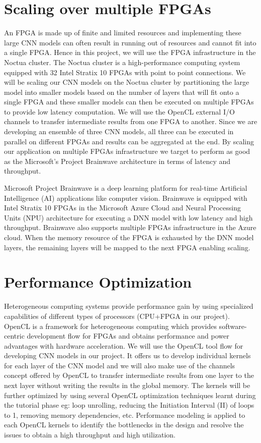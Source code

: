 \documentclass[titlepage]{report}
\begin{document}
\section{Scaling over multiple FPGAs}
An FPGA is made up of finite and limited resources and implementing these large CNN models can often result in running out of resources and cannot fit into a single FPGA. Hence in this project, we will use the FPGA infrastructure in the Noctua cluster. The Noctua cluster is a high-performance computing system equipped with 32 Intel Stratix 10 FPGAs with point to point connections. We will be scaling our CNN models on the Noctua cluster by partitioning the large model into smaller models based on the number of layers that will fit onto a single FPGA and these smaller models can then be executed on multiple FPGAs to provide low latency computation. We will use the OpenCL external I/O channels to transfer intermediate results from one FPGA to another. Since we are developing an ensemble of three CNN models, all three can be executed in parallel on different FPGAs and results can be aggregated at the end. By scaling our application on multiple FPGAs infrastructure we target to perform as good as the Microsoft's Project Brainwave architecture in terms of latency and throughput.
\par
Microsoft Project Brainwave is a deep learning platform for real-time Artificial Intelligence (AI) applications like computer vision. Brainwave is equipped with Intel Stratix 10 FPGAs in the Microsoft Azure Cloud and Neural Processing Units (NPU) architecture for executing a DNN model with low latency and high throughput. Brainwave also supports multiple FPGAs infrastructure in the Azure cloud. When the memory resource of the FPGA is exhausted by the DNN model layers, the remaining layers will be mapped to the next FPGA enabling scaling.

\section{Performance Optimization}
Heterogeneous computing systems provide performance gain by using specialized capabilities of different types of processors (CPU+FPGA in our project). OpenCL is a framework for heterogeneous computing which provides software-centric development flow for FPGAs and obtains performance and power advantages with hardware acceleration. We will use the OpenCL tool flow for developing CNN models in our project. It offers us to develop individual kernels for each layer of the CNN model and we will also make use of the channels concept offered by OpenCL to transfer intermediate results from one layer to the next layer without writing the results in the global memory. The kernels will be further optimized by using several OpenCL optimization techniques learnt during the tutorial phase eg: loop unrolling, reducing the Initiation Interval (II) of loops to 1, removing memory dependencies, etc. Performance modeling is applied to each OpenCL kernels to identify the bottlenecks in the design and resolve the issues to obtain a high throughput and high utilization.
\end{document}
